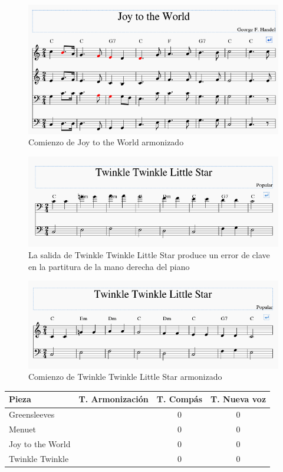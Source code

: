       \begin{figure}
      	\centering
      	\includegraphics[width=0.8\linewidth]{imagenes/evaluation/joy_harm.png}
      	\caption{Comienzo de Joy to the World armonizado}
      	\label{fig:joy_harm}
      \end{figure}
  
    \begin{figure}
    	\centering
    	\includegraphics[width=0.8\linewidth]{imagenes/evaluation/twinkle_harm_err.png}
    	\caption{La salida de Twinkle Twinkle Little Star produce un error de clave en la partitura de la mano derecha del piano}
    	\label{fig:twinkle_harm_err}
    \end{figure}
    
        \begin{figure}
        	\centering
        	\includegraphics[width=0.8\linewidth]{imagenes/evaluation/twinkle_harm.png}
        	\caption{Comienzo de Twinkle Twinkle Little Star armonizado}
        	\label{fig:twinkle_harm}
        \end{figure}
  
  \begin{center}
  	\begin{tabular}{ | l | c | c | c | }
  		\hline
  		Pieza & T. Armonización & T. Compás & T. Nueva voz \\ \hline \hline
  		Greensleeves &  & 0 & 0 \\ \hline
  		Menuet &  & 0 & 0 \\ \hline
  		Joy to the World &  & 0 & 0 \\ \hline
  		Twinkle Twinkle &  & 0 & 0 \\ \hline
  	\end{tabular}
  \end{center}
  
